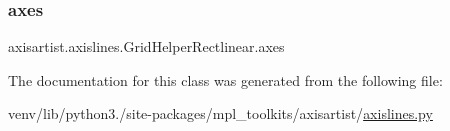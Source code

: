 \subsubsection{\texorpdfstring{axes}{axes}}
{\footnotesize\ttfamily axisartist.\+axislines.\+Grid\+Helper\+Rectlinear.\+axes}



The documentation for this class was generated from the following file\+:\begin{DoxyCompactItemize}
\item 
venv/lib/python3./site-\/packages/mpl\+\_\+toolkits/axisartist/\hyperlink{axisartist_2axislines_8py}{axislines.\+py}\end{DoxyCompactItemize}
